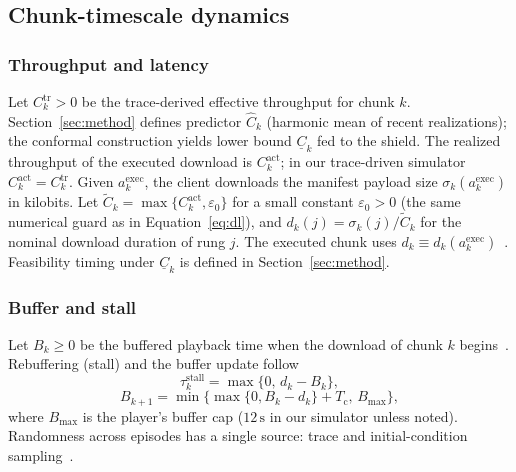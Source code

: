 \begin{cps@table}
    \caption{Session-mean representation ladder across twelve evaluation titles.
    Top gain: session-mean VMAF at \(6000\,\mathrm{kbps}\) minus session-mean VMAF at \(2850\,\mathrm{kbps}\).
    Span: session-mean VMAF at \(6000\,\mathrm{kbps}\) minus session-mean VMAF at \(300\,\mathrm{kbps}\).
    Mono.: non-decreasing session-mean ladder across rungs.
    Held-out (\checkmark): excluded from PPO training.
    SI/TI: spatial/temporal complexity indices.}
    \label{tab:ladder:spacing}
    \centering
    \evaltable{}
\end{cps@table}

\subsection{Chunk-timescale dynamics}

\subsubsection{Throughput and latency}
Let \(C^{\mathrm{tr}}_k>0\) be the trace-derived effective throughput for chunk \(k\).
Section~\ref{sec:method} defines predictor \(\hat{C}_k\) (harmonic mean of recent realizations); the conformal construction yields lower bound \(\underline{C}_k\) fed to the shield.
The realized throughput of the executed download is \(C^{\mathrm{act}}_k\); in our trace-driven simulator \(C^{\mathrm{act}}_k=C^{\mathrm{tr}}_k\).
Given \(a^{\mathrm{exec}}_k\), the client downloads the manifest payload size \(\sigma_{k}(a^{\mathrm{exec}}_k)\) in kilobits.
Let \(\tilde{C}_k=\max\{C^{\mathrm{act}}_k,\varepsilon_0\}\) for a small constant \(\varepsilon_0{>}0\) (the same numerical guard as in Equation~\eqref{eq:dl}), and \(d_k(j)=\sigma_{k}(j)/\tilde{C}_k\) for the nominal download duration of rung \(j\).
The executed chunk uses \(d_k\equiv d_k(a^{\mathrm{exec}}_k)\)~\cite{yin2015control}.
Feasibility timing under \(\underline{C}_k\) is defined in Section~\ref{sec:method}.

\subsubsection{Buffer and stall}
Let \(B_k\ge 0\) be the buffered playback time when the download of chunk \(k\) begins~\cite{yin2015control,mao2017neural}.
Rebuffering (stall) and the buffer update follow
\begin{equation}
    \tau^{\mathrm{stall}}_k=\max\{0,\, d_k-B_k\},
\end{equation}
\begin{equation}
    \label{eq:buffer}
    B_{k+1}=\min\bigl\{\max\{0,B_k-d_k\}+T_{\mathrm{c}},\,B_{\max}\bigr\},
\end{equation}
where \(B_{\max}\) is the player's buffer cap (\(12\,\mathrm{s}\) in our simulator unless noted).
Randomness across episodes has a single source: trace and initial-condition sampling~\cite{fcc2015mba,kvalbein2014,bentaleb2018survey}.

